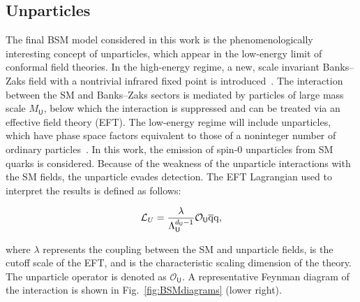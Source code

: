 \subsection{Unparticles}

The final BSM model considered in this work is the phenomenologically interesting concept of unparticles, which appear in the low-energy limit of conformal field theories.
In the high-energy regime, a new, scale invariant Banks--Zaks field with a nontrivial infrared fixed point is introduced~\cite{Banks:1981nn}.
The interaction between the SM and Banks--Zaks sectors is mediated by particles of large mass scale $M_{\textsf{U}}$, below which the interaction is suppressed and can be treated
via an effective field theory (EFT). The low-energy regime will include unparticles, which have phase space factors equivalent to those of a noninteger
number of ordinary particles~\cite{Kang:2014cia,Rinaldi:2014gha,Cheng:1988zx}. 
In this work, the emission of spin-0 unparticles from SM quarks is considered.
Because of the weakness of the unparticle interactions with the SM fields, the unparticle evades detection.
The EFT Lagrangian used to interpret the results is defined as follows:

\begin{equation*}
\mathcal{L}_{U}  = \frac{\lambda}{\Lambda_{\textsf{U}}^{d_{\textsf{U}}-1}} \mathcal{O}_{\textsf{U}} \overline{\mathrm{q}}\mathrm{q},
\end{equation*}

\noindent where $\lambda$ represents the coupling between the SM and unparticle fields, \LU is the cutoff scale of the EFT, and \dU is the characteristic scaling dimension of the theory.
The unparticle operator is denoted as $\mathcal{O}_{\textsf{U}}$.
A representative Feynman diagram of the interaction is shown in Fig.~\ref{fig:BSMdiagrams} (lower right).


